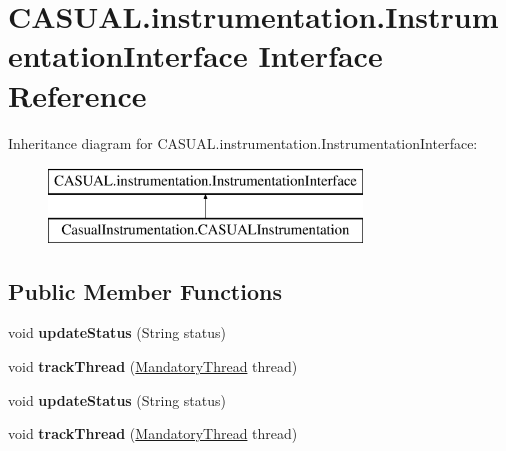 \hypertarget{interface_c_a_s_u_a_l_1_1instrumentation_1_1_instrumentation_interface}{\section{C\-A\-S\-U\-A\-L.\-instrumentation.\-Instrumentation\-Interface Interface Reference}
\label{interface_c_a_s_u_a_l_1_1instrumentation_1_1_instrumentation_interface}
}
Inheritance diagram for C\-A\-S\-U\-A\-L.\-instrumentation.\-Instrumentation\-Interface\-:\begin{figure}[H]
\begin{center}
\leavevmode
\includegraphics[height=2.000000cm]{interface_c_a_s_u_a_l_1_1instrumentation_1_1_instrumentation_interface}
\end{center}
\end{figure}
\subsection*{Public Member Functions}
\begin{DoxyCompactItemize}
\item 
\hypertarget{interface_c_a_s_u_a_l_1_1instrumentation_1_1_instrumentation_interface_afbd199512cd62a78e077c2b897a38dff}{void {\bfseries update\-Status} (String status)}\label{interface_c_a_s_u_a_l_1_1instrumentation_1_1_instrumentation_interface_afbd199512cd62a78e077c2b897a38dff}

\item 
\hypertarget{interface_c_a_s_u_a_l_1_1instrumentation_1_1_instrumentation_interface_a27978fb5a379826cc20c36957248baac}{void {\bfseries track\-Thread} (\hyperlink{class_c_a_s_u_a_l_1_1misc_1_1_mandatory_thread}{Mandatory\-Thread} thread)}\label{interface_c_a_s_u_a_l_1_1instrumentation_1_1_instrumentation_interface_a27978fb5a379826cc20c36957248baac}

\item 
\hypertarget{interface_c_a_s_u_a_l_1_1instrumentation_1_1_instrumentation_interface_afbd199512cd62a78e077c2b897a38dff}{void {\bfseries update\-Status} (String status)}\label{interface_c_a_s_u_a_l_1_1instrumentation_1_1_instrumentation_interface_afbd199512cd62a78e077c2b897a38dff}

\item 
\hypertarget{interface_c_a_s_u_a_l_1_1instrumentation_1_1_instrumentation_interface_a27978fb5a379826cc20c36957248baac}{void {\bfseries track\-Thread} (\hyperlink{class_c_a_s_u_a_l_1_1misc_1_1_mandatory_thread}{Mandatory\-Thread} thread)}\label{interface_c_a_s_u_a_l_1_1instrumentation_1_1_instrumentation_interface_a27978fb5a379826cc20c36957248baac}

\end{DoxyCompactItemize}


